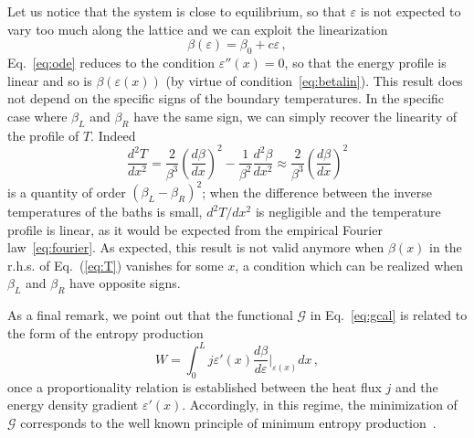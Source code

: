 \documentclass[iop, twocolumns, amssymb,notitlepage]{revtex4-1}
\begin{document}
Let us notice that the system is close to equilibrium, so that $\varepsilon$ 
is not expected to vary too much along the lattice and we can exploit the 
linearization
\begin{equation}
\label{eq:betalin}
 \beta(\varepsilon)=\beta_0+c \varepsilon\,,
\end{equation} 
Eq.~\eqref{eq:ode} reduces to the condition $\varepsilon''(x)=0$, so that the 
energy profile is linear and so is $\beta(\varepsilon(x))$ (by virtue of 
condition~\eqref{eq:betalin}).
This result does not depend on the specific signs of the boundary temperatures.
 In the specific case where  $\beta_L$ and $\beta_R$
have the same sign, we can simply recover the
 linearity of the profile of $T$. Indeed
\begin{equation}
\label{eq:T}
 \frac{d^2T}{dx^2}=\frac{2}{\beta^3}\left( \frac{d \beta}{d x}\right)^2 - 
\frac{1}{\beta^2}\frac{d ^2\beta}{d x^2} \approx \frac{2}{\beta^3}\left( \frac{d 
\beta}{d x}\right)^2
\end{equation} 
is a quantity of order $(\beta_L-\beta_R)^2$; when 
the difference between the inverse temperatures of the baths is small, $d^2T/dx^2$ is negligible and 
the temperature profile is linear, as it would be expected from the empirical Fourier law~\eqref{eq:fourier}.
 As expected, this result is not valid  anymore when $\beta(x)$ in the r.h.s. of Eq.~(\ref{eq:T}) vanishes for some $x$,
a condition which can be realized when $\beta_L$ and $\beta_R$ have opposite signs.

As a final remark, we point out  that  the functional  $\mathcal{G}$ in Eq.~\eqref{eq:gcal}
is related to the form of the entropy production 
\begin{equation}
W= \int_0^Lj  \varepsilon'(x) \frac{d \beta}{d \varepsilon}\Big|_{\varepsilon(x)}dx\,,
\end{equation}
once a proportionality relation is established between the heat flux $j$ and the 
energy density gradient $\varepsilon'(x)$. Accordingly, in this regime, the minimization of $\mathcal{G}$ corresponds to 
the well known principle of minimum entropy production~\cite{klein54}.
\end{document}
